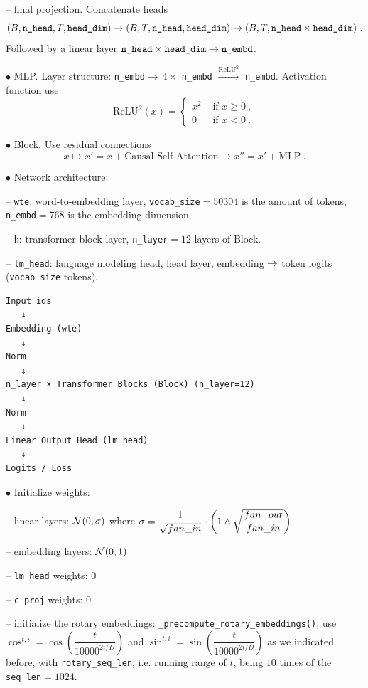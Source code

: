 -- final projection. Concatenate heads $$(B,\verb#n_head#, T, \verb#head_dim#)\ra (B, T, \verb#n_head#, \verb#head_dim#)\ra (B, T, \verb#n_head#\times \verb#head_dim#) \ .$$ Followed by a linear layer $\verb#n_head#\times \verb#head_dim# \ra \verb#n_embd#$.

$\bullet$ MLP. Layer structure: \verb#n_embd# $\rightarrow$ $4\times$ \verb#n_embd# $\stackrel{\text{ReLU}^2}{\longrightarrow}$ \verb#n_embd#. Activation function use $$\text{ReLU}^2(x)=\left\{\begin{array}{ll}
x^2 & \text{ if } x\geq 0 \ , 
\\
0 & \text{ if } x<0 \ .
\end{array}
\right.$$

$\bullet$ Block. Use residual connections $$x\mapsto x'=x+\text{Causal Self-Attention}\mapsto x'' = x'+\text{MLP} \ .$$


$\bullet$ Network architecture: 

-- \verb#wte#: word-to-embedding layer, \verb#vocab_size#$=50304$ is the amount of tokens, \verb#n_embd#$=768$ is the embedding dimension.

-- \verb#h#: transformer block layer, \verb#n_layer#$=12$ layers of Block.

-- \verb#lm_head#: language modeling head, head layer, embedding $\rightarrow$ token logits (\verb#vocab_size# tokens).

\begin{verbatim}
Input ids
   ↓
Embedding (wte)
   ↓
Norm
   ↓
n_layer × Transformer Blocks (Block) (n_layer=12)
   ↓
Norm
   ↓
Linear Output Head (lm_head)
   ↓
Logits / Loss
\end{verbatim}

$\bullet$ Initialize weights:

-- linear layers: $\mathcal N(0, \sigma)$ where $\sigma=\dfrac{1}{\sqrt{fan\_in}}\cdot \left(1\wedge \sqrt{\dfrac{fan\_out}{fan\_in}}\right)$

-- embedding layers: $\mathcal N(0,1)$

-- \verb#lm_head# weights: 0

-- \verb#c_proj# weights: 0

-- initialize the rotary embeddings: \verb#_precompute_rotary_embeddings()#, use $\cos^{t,i}=\cos \left(\dfrac{t}{10000^{2i/D}}\right)$ and $\sin^{t,i}=\sin \left(\dfrac{t}{10000^{2i/D}}\right)$ as we indicated before, with \verb#rotary_seq_len#, i.e. running range of $t$, being $10$ times of the \verb#seq_len#$=1024$.

